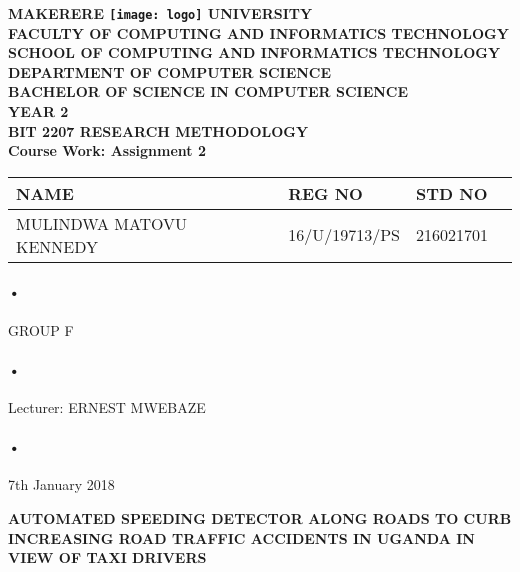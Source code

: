 \documentclass[12pt]{article}
\begin{document}
\begin{Huge}
\begin{center}
\begin{normalsize}
\textbf{MAKERERE \texttt{[image: logo]} UNIVERSITY }\\


\textbf{FACULTY OF COMPUTING AND INFORMATICS TECHNOLOGY} \\
\textbf{SCHOOL OF COMPUTING AND INFORMATICS TECHNOLOGY} \\
\textbf{DEPARTMENT OF COMPUTER SCIENCE} \\
\textbf{BACHELOR OF SCIENCE IN COMPUTER SCIENCE} \\
\textbf{YEAR 2} \\
\textbf{BIT 2207 RESEARCH METHODOLOGY} \\
\textbf{Course Work: Assignment 2}\\
\end{normalsize}
\end{center}
\end{Huge}

\begin{center}
\begin{tabular}{|l|l|l|c|}
\hline NAME  & REG NO & STD NO \\\hline
MULINDWA MATOVU KENNEDY& 16/U/19713/PS & 216021701 \\\hline
\end{tabular}
\paragraph{•}
GROUP F\\
\paragraph{•}
Lecturer: ERNEST MWEBAZE \\
\paragraph{•}
7th January 2018

\end{center}

\newpage

\begin{center}
\textbf{AUTOMATED SPEEDING DETECTOR ALONG ROADS TO CURB INCREASING ROAD TRAFFIC ACCIDENTS IN UGANDA IN VIEW OF TAXI DRIVERS}\\
\end{center}
\end{document}

